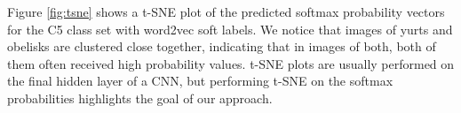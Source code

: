 Figure \ref{fig:tsne} shows a t-SNE plot of the predicted softmax probability
vectors for the C5 class set with word2vec soft labels. We notice that images of
yurts and obelisks are clustered close together, indicating that in images of
both, both of them often received high probability values. t-SNE plots are
usually performed on the final hidden layer of a CNN, but performing t-SNE on
the softmax probabilities highlights the goal of our approach.



%
